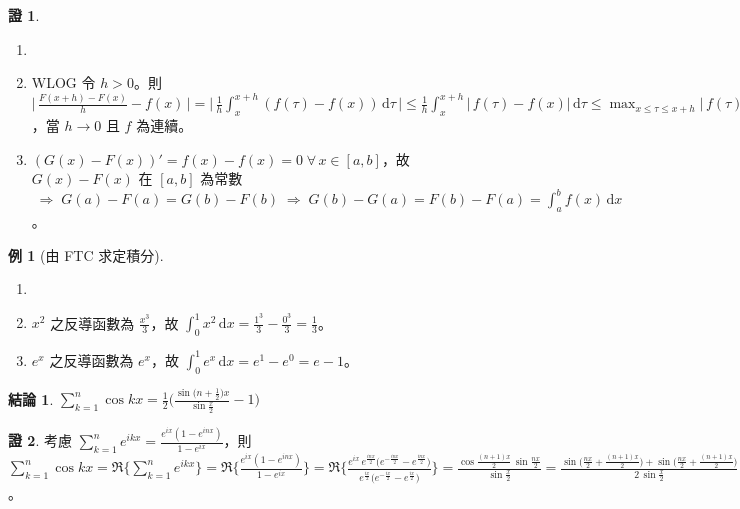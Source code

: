 \documentclass[12pt]{extarticle}
\newcommand{\ds}{\displaystyle}
\newcommand{\ie}{\;\Longrightarrow\;}
\theoremstyle{definition}
\newtheorem*{fact}{結論}
\newtheorem*{ex}{例}
\newtheorem*{prf}{證}
\begin{document}
\begin{prf}
  \begin{enumerate}\setlength\itemsep{0em}
    \item[]
    \item WLOG 令 $h > 0$。則 $\ds\Bigg|\,\frac{F(x + h) - F(x)}{h} - f(x)\,\Bigg| = \Bigg|\,\frac{1}{h}\int_x^{x + h}(f(\tau) - f(x))\,\mathrm{d}\tau\,\Bigg| \leqslant\frac{1}{h}\int_x^{x + h}\big|\,f(\tau) - f(x)\big|\,\mathrm{d}\tau \leqslant\max_{x\leqslant\tau\leqslant x+h}\big|\,f(\tau) - f(x)\big|\to 0$，當 $h\to 0$ 且 $f$ 為連續。
    \item $\ds(G(x) - F(x))' = f(x) - f(x) = 0\;\forall\,x\in[a, b]$，故 $\ds G(x) - F(x)$ 在 $[a, b]$ 為常數 $\ds\ie G(a) - F(a) = G(b) - F(b) \ie G(b) - G(a) = F(b) - F(a) = \int_a^b f(x)\,\mathrm{d}x$。
  \end{enumerate}
\end{prf}

\begin{ex}[由 FTC 求定積分]
  \begin{enumerate}\setlength\itemsep{0em}
    \item[]
    \item $\ds x^2$ 之反導函數為 $\ds\frac{x^3}{3}$，故 $\ds\int_0^1 x^2\,\text{d}x = \frac{1^3}{3} - \frac{0^3}{3} = \frac{1}{3}$。
    \item $\ds e^x$ 之反導函數為 $\ds e^x$，故 $\ds\int_0^1 e^x\,\text{d}x = e^1 - e^0 = e - 1$。
  \end{enumerate}
\end{ex}

\begin{fact}
  $\ds\sum_{k = 1}^n \cos kx = \frac{1}{2}\bigg(\frac{\sin\big(n+\frac{1}{2}\big)x}{\sin\frac{x}{2}}-1\bigg)$
\end{fact}

\begin{prf}
  考慮 $\ds\sum_{k = 1}^{n} e^{ikx} = \frac{e^{ix}(1 - e^{inx})}{1 - e^{ix}}$，則 $\ds\sum_{k = 1}^{n} \cos kx = \Re\Big\{\sum_{k = 1}^n e^{ikx}\Big\} = \Re\Big\{\frac{e^{ix}(1 - e^{inx})}{1 - e^{ix}}\Big\} = \Re\bigg\{\frac{e^{ix}\,e^{\frac{inx}{2}}\big(e^{-\frac{inx}{2}} - e^{\frac{inx}{2}}\big)}{e^{\frac{ix}{2}}\big(e^{-\frac{ix}{2}} - e^{\frac{ix}{2}}\big)}\bigg\} = \frac{\cos\frac{(n+1)x}{2}\,\sin\frac{nx}{2}}{\sin\frac{x}{2}} = \frac{\sin\big(\frac{nx}{2} + \frac{(n + 1)x}{2}\big) + \sin\big(\frac{nx}{2} + \frac{(n + 1)x}{2}\big)}{2\,\sin\frac{x}{2}} = \frac{\sin\big(n+\frac{1}{2}\big)x - \sin\frac{x}{2}}{2\,\sin\frac{x}{2}} = \frac{1}{2}\bigg(\frac{\sin\big(n+\frac{1}{2}\big)x}{\sin\frac{x}{2}}-1\bigg)$。 
\end{prf}
\end{document}
